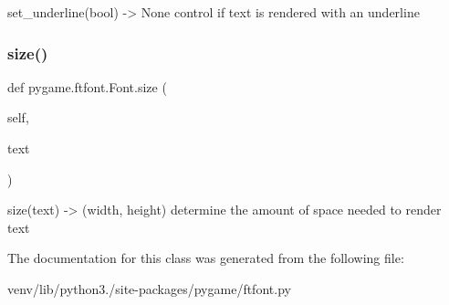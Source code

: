 \begin{DoxyVerb}set_underline(bool) -> None
   control if text is rendered with an underline\end{DoxyVerb}
 \mbox{\label{classpygame_1_1ftfont_1_1_font_a74f9f8b405c9af43c84703d2552e4cac}} 
\subsubsection{\texorpdfstring{size()}{size()}}
{\footnotesize\ttfamily def pygame.\+ftfont.\+Font.\+size (\begin{DoxyParamCaption}\item[{}]{self,  }\item[{}]{text }\end{DoxyParamCaption})}

\begin{DoxyVerb}size(text) -> (width, height)
   determine the amount of space needed to render text\end{DoxyVerb}
 

The documentation for this class was generated from the following file\+:\begin{DoxyCompactItemize}
\item 
venv/lib/python3./site-\/packages/pygame/ftfont.\+py\end{DoxyCompactItemize}
